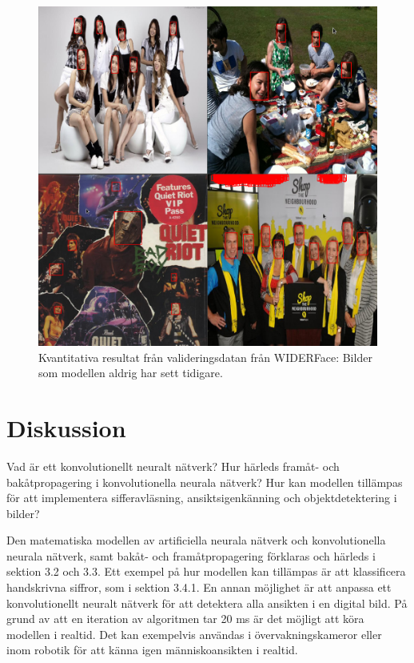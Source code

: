 \documentclass[a4paper,11pt,twoside]{article}
\begin{document}
\begin{figure}[h]\label{results1}
	\centering
  		\includegraphics[scale=0.42]{results1.png}
  	\caption{Kvantitativa resultat från valideringsdatan från WIDERFace: Bilder som modellen aldrig har sett tidigare.}
\end{figure}

\section{Diskussion}
Vad är ett konvolutionellt neuralt nätverk?
Hur härleds framåt- och bakåtpropagering i konvolutionella neurala nätverk?
Hur kan modellen tillämpas för att implementera sifferavläsning, ansiktsigenkänning och objektdetektering i bilder?

Den matematiska modellen av artificiella neurala nätverk och konvolutionella neurala nätverk, samt bakåt- och framåtpropagering förklaras och härleds i sektion 3.2 och 3.3. Ett exempel på hur modellen kan tillämpas är att klassificera handskrivna siffror, som i sektion 3.4.1. 
En annan möjlighet är att anpassa ett konvolutionellt neuralt nätverk för att detektera alla ansikten i en digital bild. På grund av att en iteration av algoritmen tar 20 ms är det möjligt att köra modellen i realtid. Det kan exempelvis användas i övervakningskameror eller inom robotik för att känna igen människoansikten i realtid. 
\end{document}
